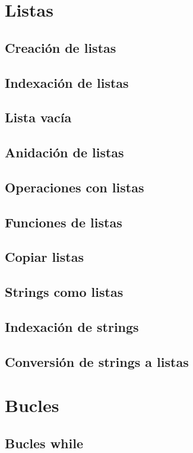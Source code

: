 \documentclass{article}
\begin{document}
    \section{Listas}

      \subsection{Creación de listas}
      \subsection{Indexación de listas}
      \subsection{Lista vacía}
      \subsection{Anidación de listas}
      \subsection{Operaciones con listas}
      \subsection{Funciones de listas}
      \subsection{Copiar listas}
      \subsection{Strings como listas}
      \subsection{Indexación de strings}
      \subsection{Conversión de strings a listas}

    \section{Bucles}

      \subsection{Bucles while}
\end{document}
